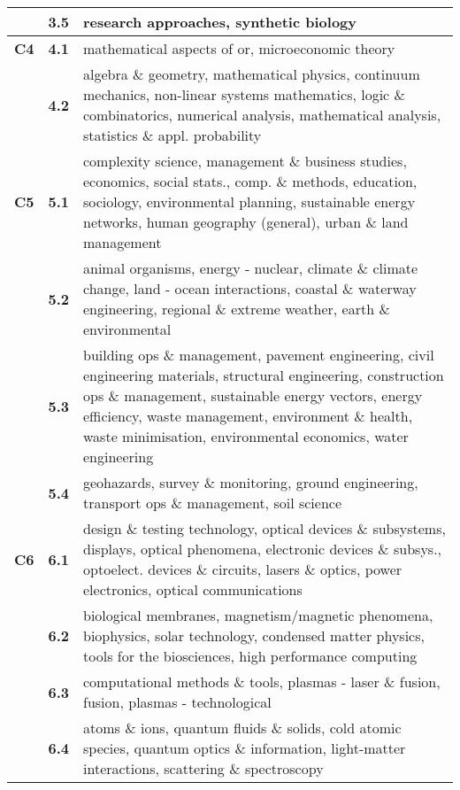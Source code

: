 \begin{spacing}{0.9}
\begin{longtable}[r]{r|r|p{11.5cm}}
& \textbf{3.5} & {research approaches, synthetic biology}\\
\hline
\textbf{C4}
& \textbf{4.1} & {mathematical aspects of or, microeconomic theory}\\
& \textbf{4.2} & {algebra \& geometry, mathematical physics, continuum mechanics, non-linear systems mathematics, logic \& combinatorics, numerical analysis, mathematical analysis, statistics \& appl. probability}\\
\hline
\textbf{C5}
& \textbf{5.1} & {complexity science, management \& business studies, economics, social stats., comp. \& methods, education, sociology, environmental planning, sustainable energy networks, human geography (general), urban \& land management}\\
& \textbf{5.2} & {animal organisms, energy - nuclear, climate \& climate change, land - ocean interactions, coastal \& waterway engineering, regional \& extreme weather, earth \& environmental}\\
& \textbf{5.3} & {building ops \& management, pavement engineering, civil engineering materials, structural engineering, construction ops \& management, sustainable energy vectors, energy efficiency, waste management, environment \& health, waste minimisation, environmental economics, water engineering}\\
& \textbf{5.4} & {geohazards, survey \& monitoring, ground engineering, transport ops \& management, soil science}\\
\hline
\textbf{C6}
& \textbf{6.1} & {design \& testing technology, optical devices \& subsystems, displays, optical phenomena, electronic devices \& subsys., optoelect. devices \& circuits, lasers \& optics, power electronics, optical communications}\\
& \textbf{6.2} & {biological membranes, magnetism/magnetic phenomena, biophysics, solar technology, condensed matter physics, tools for the biosciences, high performance computing}\\
& \textbf{6.3} & {computational methods \& tools, plasmas - laser \& fusion, fusion, plasmas - technological}\\
& \textbf{6.4} & {atoms \& ions, quantum fluids \& solids, cold atomic species, quantum optics \& information, light-matter interactions, scattering \& spectroscopy}
\end{longtable}
\end{spacing}

\clearpage

